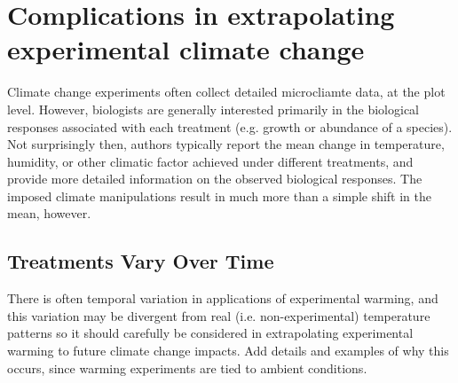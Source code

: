 \documentclass{article}
\begin{document}
\section {Complications in extrapolating experimental climate change}
Climate change experiments often collect detailed microcliamte data, at the plot level. However, biologists are generally interested primarily in the biological responses associated with each treatment (e.g. growth or abundance of a species). Not surprisingly then, authors typically report the mean change in temperature, humidity, or other climatic factor achieved under different treatments, and provide more detailed information on the observed biological responses. The imposed climate manipulations result in much more than a simple shift in the mean, however.
\subsection {Treatments Vary Over Time}
There is often temporal variation in applications of experimental warming, and this variation may be divergent from real (i.e. non-experimental) temperature patterns so it should carefully be considered in extrapolating experimental warming to future climate change impacts. Add details and examples of why this occurs, since warming experiments are tied to ambient conditions. 
\end{document}
